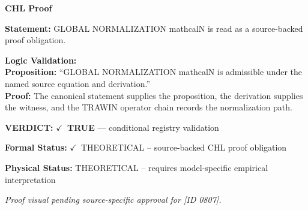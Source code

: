 \vspace{0.45em}
\noindent\textbf{CHL Proof}\par
\textbf{Statement:} GLOBAL NORMALIZATION mathcalN is read as a source-backed proof obligation.

\textbf{Logic Validation:}\\
\textbf{Proposition:} ``GLOBAL NORMALIZATION mathcalN is admissible under the named source equation and derivation.''\\
\textbf{Proof:} The canonical statement supplies the proposition, the derivation supplies the witness, and the TRAWIN operator chain records the normalization path.

\textbf{VERDICT:} \ensuremath{\checkmark}\ \textbf{TRUE} --- conditional registry validation

\textbf{Formal Status:} \ensuremath{\checkmark}\ THEORETICAL -- source-backed CHL proof obligation

\textbf{Physical Status:} THEORETICAL -- requires model-specific empirical interpretation
\par\vspace{0.45em}
\par
\vfill
\begingroup\footnotesize\itshape
Proof visual pending source-specific approval for [ID 0807].
\par\endgroup
\vfill
\endgroup
\endgroup
